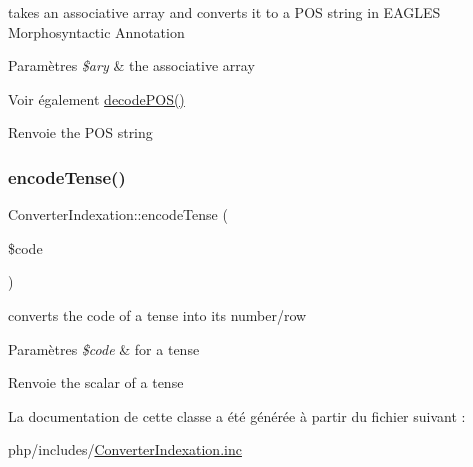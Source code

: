 takes an associative array and converts it to a P\+OS string in E\+A\+G\+L\+ES Morphosyntactic Annotation 


\begin{DoxyParams}{Paramètres}
{\em \$ary} & the associative array \\
\hline
\end{DoxyParams}
\begin{DoxySeeAlso}{Voir également}
\hyperlink{classConverterIndexation_a6012e4df4619a7cc1c55c811fc50690d}{decode\+P\+O\+S()} 
\end{DoxySeeAlso}
\begin{DoxyReturn}{Renvoie}
the P\+OS string 
\end{DoxyReturn}
\hypertarget{classConverterIndexation_aeabe347658ec9c09bf8ca65262ef6fa8}{}\label{classConverterIndexation_aeabe347658ec9c09bf8ca65262ef6fa8} 
\subsubsection{\texorpdfstring{encode\+Tense()}{encodeTense()}}
{\footnotesize\ttfamily Converter\+Indexation\+::encode\+Tense (\begin{DoxyParamCaption}\item[{}]{\$code }\end{DoxyParamCaption})}



converts the code of a tense into its number/row 


\begin{DoxyParams}{Paramètres}
{\em \$code} & for a tense \\
\hline
\end{DoxyParams}
\begin{DoxyReturn}{Renvoie}
the scalar of a tense 
\end{DoxyReturn}


La documentation de cette classe a été générée à partir du fichier suivant \+:\begin{DoxyCompactItemize}
\item 
php/includes/\hyperlink{ConverterIndexation_8inc}{Converter\+Indexation.\+inc}\end{DoxyCompactItemize}
